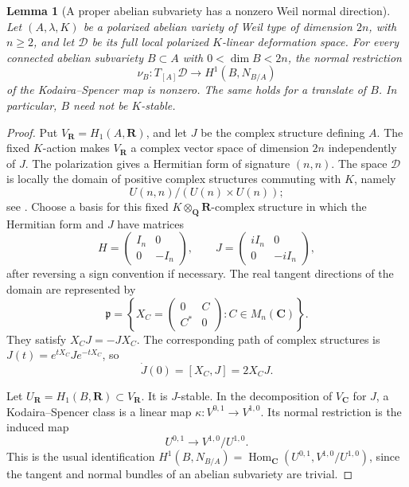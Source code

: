 \documentclass[11pt]{article}
\newtheorem{lemma}[theorem]{Lemma}
\theoremstyle{definition}
\theoremstyle{remark}
\newcommand{\C}{\mathbf C}
\begin{document}
\begin{lemma}[A proper abelian subvariety has a nonzero Weil normal direction]
\label{lem:proper-abelian-weil-normal}
Let $(A,\lambda,K)$ be a polarized abelian variety of Weil type of
dimension $2n$, with $n\geq2$, and let $\mathcal D$ be its full local
polarized $K$-linear deformation space.  For every connected abelian
subvariety $B\subset A$ with $0<\dim B<2n$, the normal restriction
\[
 \nu_B:T_{[A]}\mathcal D\longrightarrow H^1(B,N_{B/A})
\]
of the Kodaira--Spencer map is nonzero.  The same holds for a translate
of $B$.  In particular, $B$ need not be $K$-stable.
\end{lemma}

\begin{proof}
Put $V_{\mathbf R}=H_1(A,\mathbf R)$, and let $J$ be the complex
structure defining $A$.  The fixed $K$-action makes $V_{\mathbf R}$
a complex vector space of dimension $2n$ independently of $J$.
The polarization gives a Hermitian form of signature $(n,n)$.
The space $\mathcal D$ is locally the domain of positive complex
structures commuting with $K$, namely
\[
 U(n,n)/(U(n)\times U(n));
\]
see \cite[\S4.5, p.~7]{vGWeilSpinor}.  Choose a basis for this
fixed $K\otimes_{\mathbf Q}\mathbf R$-complex structure in which
the Hermitian form and $J$ have matrices
\[
 H=\begin{pmatrix}I_n&0\\0&-I_n\end{pmatrix},
 \qquad
 J=\begin{pmatrix}iI_n&0\\0&-iI_n\end{pmatrix},
\]
after reversing a sign convention if necessary.  The real tangent
directions of the domain are represented by
\[
 \mathfrak p=
 \left\{X_C=\begin{pmatrix}0&C\\C^*&0\end{pmatrix}:
                 C\in M_n(\mathbf C)\right\}.
\]
They satisfy $X_CJ=-JX_C$.  The corresponding path of complex
structures is $J(t)=e^{tX_C}Je^{-tX_C}$, so
\[
 \dot J(0)=[X_C,J]=2X_CJ.
\]

Let $U_{\mathbf R}=H_1(B,\mathbf R)\subset V_{\mathbf R}$.
It is $J$-stable.  In the decomposition of $V_{\mathbf C}$ for $J$,
a Kodaira--Spencer class is a linear map
$\kappa:V^{0,1}\to V^{1,0}$.  Its normal restriction is the
induced map
\[
 U^{0,1}\longrightarrow V^{1,0}/U^{1,0}.
\]
This is the usual identification
$H^1(B,N_{B/A})=\operatorname{Hom}_{\mathbf C}
(U^{0,1},V^{1,0}/U^{1,0})$, since the tangent and normal bundles
of an abelian subvariety are trivial.


\end{proof}
\end{document}

